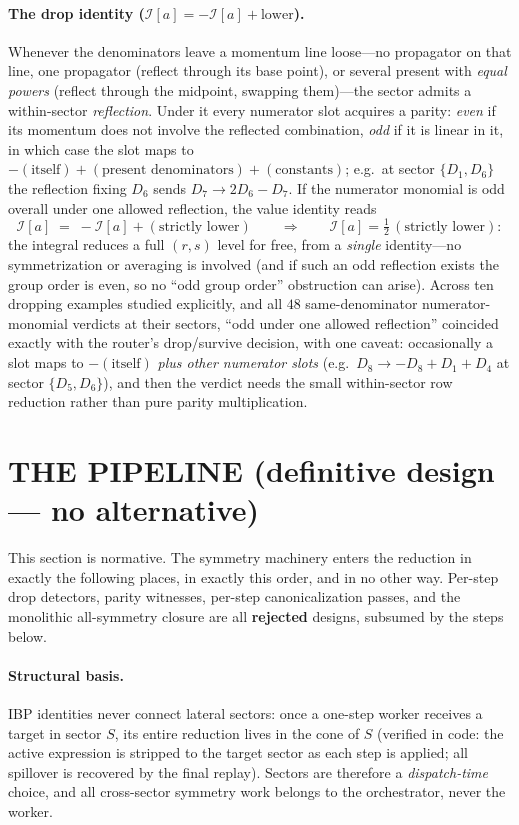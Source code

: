 \documentclass[11pt]{article}
\newcommand{\I}[1]{\mathcal{I}[#1]}
\begin{document}
\paragraph{The drop identity ($\I{a}=-\I{a}+\text{lower}$).}
Whenever the denominators leave a momentum line loose---no propagator on that line, one
propagator (reflect through its base point), or several present with \emph{equal
powers} (reflect through the midpoint, swapping them)---the sector admits a
within-sector \emph{reflection}. Under it every numerator slot acquires a parity:
\emph{even} if its momentum does not involve the reflected combination, \emph{odd} if
it is linear in it, in which case the slot maps to $-(\text{itself}) + (\text{present
denominators}) + (\text{constants})$; e.g.\ at sector $\{D_1,D_6\}$ the reflection
fixing $D_6$ sends $D_7\to 2D_6-D_7$. If the numerator monomial is odd overall under
one allowed reflection, the value identity reads
\begin{equation}
\I{a} \;=\; -\I{a} + (\text{strictly lower})\qquad\Longrightarrow\qquad
\I{a}=\tfrac12\,(\text{strictly lower}):
\end{equation}
the integral reduces a full $(r,s)$ level for free, from a \emph{single} identity---no
symmetrization or averaging is involved (and if such an odd reflection exists the group
order is even, so no ``odd group order'' obstruction can arise). Across ten dropping
examples studied explicitly, and all $48$ same-denominator numerator-monomial verdicts
at their sectors, ``odd under one allowed reflection'' coincided exactly with the
router's drop/survive decision, with one caveat: occasionally a slot maps to
$-(\text{itself})$ \emph{plus other numerator slots} (e.g.\ $D_8\to-D_8+D_1+D_4$ at
sector $\{D_5,D_6\}$), and then the verdict needs the small within-sector row reduction
rather than pure parity multiplication.

\section{THE PIPELINE (definitive design --- no alternative)}
\label{sec:pipeline}
This section is normative. The symmetry machinery enters the reduction in exactly the
following places, in exactly this order, and in no other way. Per-step drop detectors,
parity witnesses, per-step canonicalization passes, and the monolithic all-symmetry
closure are all \textbf{rejected} designs, subsumed by the steps below.

\paragraph{Structural basis.} IBP identities never connect lateral sectors: once a
one-step worker receives a target in sector $S$, its entire reduction lives in the
cone of $S$ (verified in code: the active expression is stripped to the target sector
as each step is applied; all spillover is recovered by the final replay). Sectors are
therefore a \emph{dispatch-time} choice, and all cross-sector symmetry work belongs to
the orchestrator, never the worker.
\end{document}
